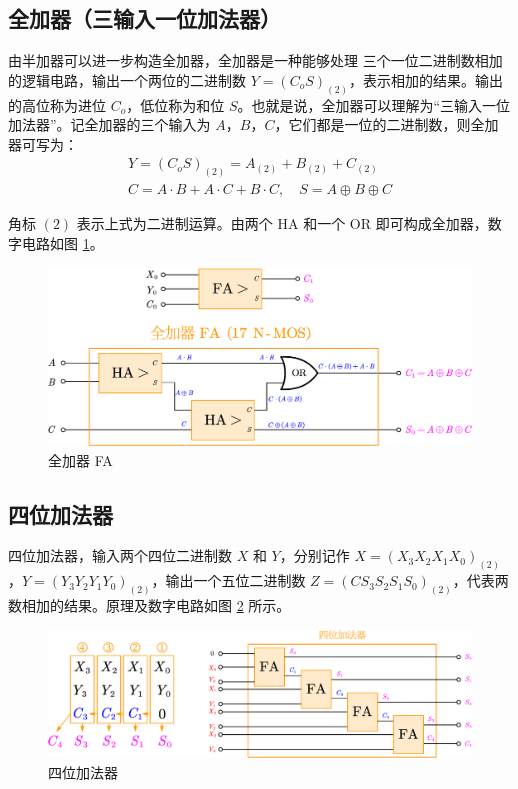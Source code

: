 \documentclass[UTF8]{report}
\theoremstyle{MyLineTheoremStyle} %
\theoremstyle{MyBlockTheoremStyle} %
\theoremstyle{MySubsubsectionStyle} %
\begin{document}
\subsection{全加器（三输入一位加法器）}

由半加器可以进一步构造全加器，全加器是一种能够处理{\color{red} 三个一位二进制数}相加的逻辑电路，输出一个两位的二进制数 $Y= (C_o S)_{(2)}$，表示相加的结果。输出的高位称为进位 $C_o$，低位称为和位 $S$。也就是说，全加器可以理解为“三输入一位加法器”。记全加器的三个输入为 $A$，$B$，$C$，它们都是一位的二进制数，则全加器可写为：
\begin{gather}
Y= (C_oS)_{(2)} = A_{(2)} + B_{(2)} + C_{(2)} 
\\ 
C = A \cdot B + A \cdot C + B \cdot C,\quad 
S = A \oplus B \oplus C
\end{gather}


角标 $(2)$ 表示上式为二进制运算。由两个 HA 和一个 OR 即可构成全加器，数字电路如图 \ref{全加器 FA}。

\begin{figure}[H]\centering
\includegraphics[width=0.65\columnwidth]{assets/2/全加器.pdf}
\caption{ 全加器 FA}\label{全加器 FA}
\end{figure}




\subsection{四位加法器}

四位加法器，输入两个四位二进制数 $X$ 和 $Y$，分别记作 $ X= (X_3 X_2 X_1 X_0)_{(2)}$，$ Y=  (Y_3 Y_2 Y_1 Y_0)_{(2)}$，输出一个五位二进制数 $Z = (C S_3 S_2 S_1 S_0)_{(2)}$，代表两数相加的结果。原理及数字电路如图 \ref{四位加法器} 所示。

\begin{figure}[H]\centering
\includegraphics[width=0.9\columnwidth]{assets/2/四位加法器.pdf}
\caption{ 四位加法器}\label{四位加法器}
\end{figure}
\end{document}
